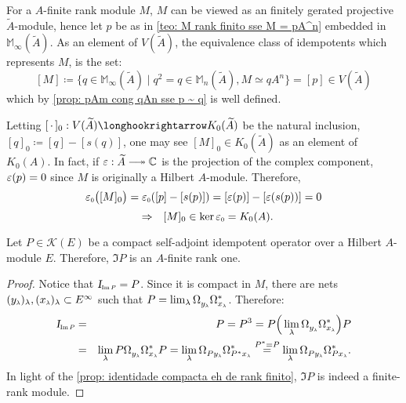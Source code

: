 For a $A$-finite rank module $M$, $M$ can be viewed as an finitely gerated projective $\widetilde A$-module, hence let $p$ be as in \ref{teo: M rank finito sse M = pA^n} embedded in $\mathbb M_{\infty}({\widetilde{A}})$. As an element of $V({\widetilde{A}})$, the equivalence class of idempotents which represents $M$, is the set:
\[
[M] \coloneqq  \{q \in \mathbb M_\infty({\widetilde{A}}) \mid q^2 = q \in \mathbb M_{n}({\widetilde{A}}), M \simeq q A^n\} = [p] \in V({\widetilde{A}})
\]
which by \ref{prop: pAm cong qAn sse p ~ q} is well defined.

Letting $[\,\cdot\,]_0 : V({\widetilde{A}}) \longhookrightarrow K_0({\widetilde{A}})$ be the natural inclusion, $[q]_0 \coloneqq [q]- [s(q)]$, one may see $[M]_0 \in K_0({\widetilde{A}})$ as an element of $K_0(A)$. In fact, if $\ep : \widetilde A \longtwoheadrightarrow \C$ is the projection of the complex component, $\operatorname{{\varepsilon}}(p) = 0$ since $M$ is originally a Hilbert $A$-module. Therefore,
\[
\sub\ep0\big([M]_0\big) = \sub\ep0([p] - [s(p)]) = [\ep(p)]- [\ep(s(p))] = 0 
\]
\[
\To [M]_0 \in \ker \sub\ep0 = K_0(A).
\]

\begin{proposicao}
\label{prop: compacto idempotente eh rank finito}
Let $P \in \mathscr K(E)$ be a compact self-adjoint idempotent operator over a Hilbert $A$-module $E$. Therefore, $\Im P$ is an $A$-finite rank one.
\begin{proof}
Notice that $\sub{\Id}{\Im P} = P$. Since it is compact in $M$, there are nets $(\sub y\lambda)_\lambda, (\sub x\lambda)_\lambda \subset E^{\infty}$ such that $P = \lim_\lambda \Omega_{\sub y\lambda}^{\vphantom{*}}\Omega_{\sub x\lambda}^*$. Therefore:
\begin{eqnarray*}
\sub{\Id}{\Im P} &=& P = P^3 = P\Big(\lim_\lambda \Omega_{\sub y\lambda}^{\vphantom{*}}\Omega_{\sub x\lambda}^*\Big)P\\
&=& \lim_\lambda P\Omega_{\sub y\lambda}^{\vphantom{*}}\Omega_{\sub x\lambda}^*P =  \lim_\lambda \Omega_{P\sub y\lambda}^{\vphantom{*}}\Omega_{P^*\sub x\lambda}^*
\overset{P^*=P}= \lim_\lambda \Omega_{P\sub y\lambda}^{\vphantom{*}}\Omega_{P\sub x\lambda}^*.
\end{eqnarray*}
In light of the \ref{prop: identidade compacta eh de rank finito}, ${\Im P}$ is indeed a finite-rank module.
\end{proof}
\end{proposicao}

